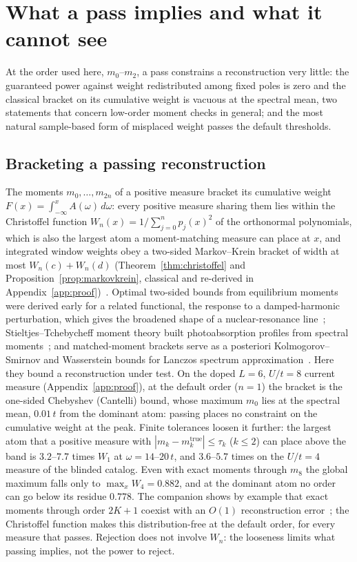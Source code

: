 \documentclass[submission, PhysCore]{SciPost}
\begin{document}
\section{What a pass implies and what it cannot see}
\label{sec:pass}
\label{sec:christoffel}
\label{sec:detect}
At the order used here, $m_0$--$m_2$, a pass constrains a reconstruction very little: the guaranteed power against weight redistributed among fixed poles is zero and the classical bracket on its cumulative weight is vacuous at the spectral mean, two statements that concern low-order moment checks in general; and the most natural sample-based form of misplaced weight passes the default thresholds.

\subsection{Bracketing a passing reconstruction}
The moments $m_0,\dots,m_{2n}$ of a positive measure bracket its cumulative weight $F(x)=\int_{-\infty}^{x}A(\omega)\,d\omega$: every positive measure sharing them lies within the Christoffel function $W_n(x)=1/\sum_{j=0}^n p_j(x)^2$ of the orthonormal polynomials, which is also the largest atom a moment-matching measure can place at $x$, and integrated window weights obey a two-sided Markov--Krein bracket of width at most $W_n(c)+W_n(d)$ (Theorem~\ref{thm:christoffel} and Proposition~\ref{prop:markovkrein}, classical and re-derived in Appendix~\ref{app:proof})~\cite{GM2010,ShohatTamarkin1943,Akhiezer1965,KreinNudelman1977,KarlinStudden1966}. Optimal two-sided bounds from equilibrium moments were derived early for a related functional, the response to a damped-harmonic perturbation, which gives the broadened shape of a nuclear-resonance line~\cite{Gordon1968}; Stieltjes--Tchebycheff moment theory built photoabsorption profiles from spectral moments~\cite{Langhoff1976}; and matched-moment brackets serve as a posteriori Kolmogorov--Smirnov and Wasserstein bounds for Lanczos spectrum approximation~\cite{ChenTrogdonUbaru2021}. Here they bound a reconstruction under test. On the doped $L=6$, $U/t=8$ current measure (Appendix~\ref{app:proof}), at the default order ($n=1$) the bracket is the one-sided Chebyshev (Cantelli) bound, whose maximum $m_0$ lies at the spectral mean, $0.01\,t$ from the dominant atom: passing places no constraint on the cumulative weight at the peak. Finite tolerances loosen it further: the largest atom that a positive measure with $|m_k-m_k^{\mathrm{true}}|\le\tau_k$ ($k\le2$) can place above the band is $3.2$--$7.7$ times $W_1$ at $\omega=14$--$20\,t$, and $3.6$--$5.7$ times on the $U/t=4$ measure of the blinded catalog. Even with exact moments through $m_8$ the global maximum falls only to $\max_xW_4=0.882$, and at the dominant atom no order can go below its residue $0.778$. The companion shows by example that exact moments through order $2K+1$ coexist with an $O(1)$ reconstruction error~\cite{SQDspec2608}; the Christoffel function makes this distribution-free at the default order, for every measure that passes. Rejection does not involve $W_n$: the looseness limits what passing implies, not the power to reject.
\end{document}

